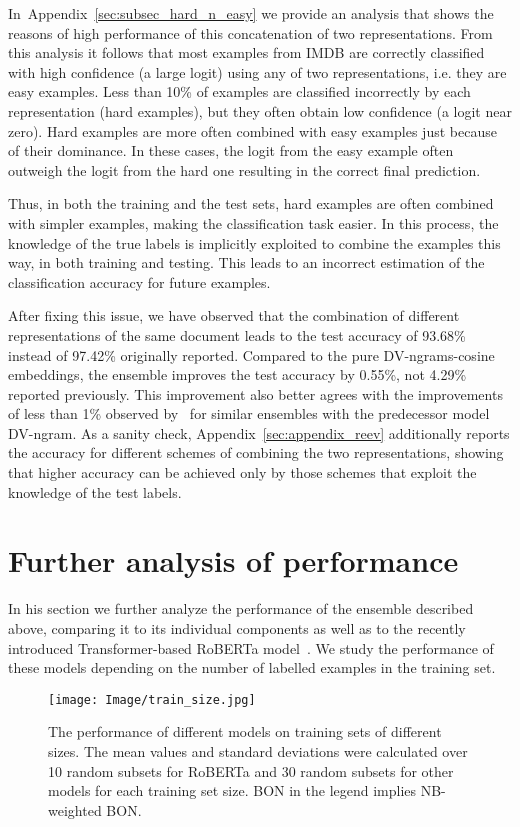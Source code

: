 \documentclass[11pt]{article}
\begin{document}
In~Appendix~\ref{sec:subsec_hard_n_easy} we provide an analysis that shows the reasons of high performance of this concatenation of two representations. From this analysis it follows that most examples from IMDB are correctly classified with high confidence (a large logit) using any of two representations, i.e. they are easy examples. Less than 10\% of examples are classified incorrectly by each representation (hard examples), but they often obtain low confidence (a logit near zero). Hard examples are more often combined with  easy examples just because of their dominance. In these cases, the logit from the easy example often outweigh the logit from the hard one resulting in the correct final prediction.

Thus, in both the training and the test sets, hard examples are often combined with simpler examples, making the classification task easier. In this process, the knowledge of the true labels is implicitly exploited to combine the examples this way, in both training and testing. This leads to an incorrect estimation of the classification accuracy for future examples.

After fixing this issue, we have observed that the combination of different representations of the same document leads to the test accuracy of 93.68\% instead of 97.42\% originally reported. Compared to the pure DV-ngrams-cosine embeddings, the ensemble improves the test accuracy by 0.55\%, not 4.29\% reported previously. This improvement also better agrees with the improvements of less than 1\% observed by~\citet{li_2016} for similar ensembles with the predecessor model DV-ngram. As a sanity check, Appendix~\ref{sec:appendix_reev} additionally reports the accuracy for different schemes of combining the two representations, showing that higher accuracy can be achieved only by those schemes that exploit the knowledge of the test labels.\newline


\section{Further analysis of performance}
\label{sec:train_size}
In his section we further analyze the performance of the ensemble described above, comparing it to its individual components as well as to the recently introduced Transformer-based RoBERTa model~\cite{liu2020roberta}. We study the performance of these models depending on the number of labelled examples in the training set.
\begin{figure}[ht] \centering \texttt{[image: Image/train\_size.jpg]} 
    \caption{The performance of different models on training sets of different sizes. The mean values and standard deviations were calculated over 10 random subsets for RoBERTa and 30 random subsets for other models for each training set size. BON in the legend implies NB-weighted BON.}
    \label{fig:train_size}
\end{figure}
\end{document}
